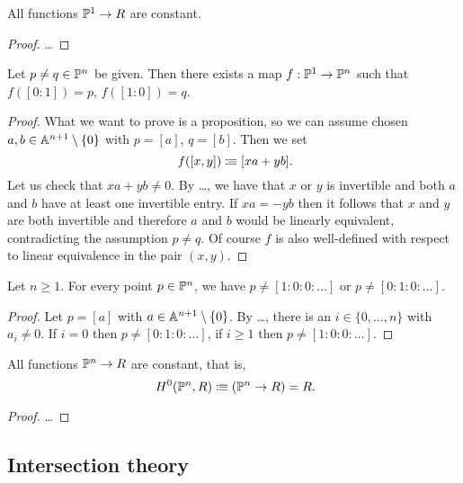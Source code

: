 \begin{lemma}
  All functions $\mathbb{P}^1 \to R$ are constant.
\end{lemma}

\begin{proof}
  \dots
\end{proof}

\begin{lemma}
  Let $p \neq q \in \mathbb{P}^n$ be given.
  Then there exists a map $f : \mathbb{P}^1 \to \mathbb{P}^n$
  such that $f([0 : 1]) = p$, $f([1 : 0]) = q$.
\end{lemma}

\begin{proof}
  What we want to prove is a proposition,
  so we can assume chosen $a, b \in \mathbb{A}^{n+1} \setminus \{0\}$
  with $p = [a]$, $q = [b]$.
  Then we set
  \[ f([x, y]) \colonequiv [xa + yb] \rlap{.}\]
  Let us check that $xa + yb \neq 0$.
  By \dots,
  we have that $x$ or $y$ is invertible
  and both $a$ and $b$ have at least one invertible entry.
  If $xa = - yb$
  then it follows that $x$ and $y$ are both invertible
  and therefore $a$ and $b$ would be linearly equivalent,
  contradicting the assumption $p \neq q$.
  Of course $f$ is also well-defined
  with respect to linear equivalence in the pair $(x, y)$.
\end{proof}

\begin{lemma}
  Let $n \geq 1$.
  For every point $p \in \mathbb{P}^n$,
  we have $p \neq [1 : 0 : 0 : \dots]$
  or $p \neq [0 : 1 : 0 : \dots]$.
\end{lemma}

\begin{proof}
  Let $p = [a]$ with $a \in \mathbb{A}^{n+1} \setminus \{0\}$.
  By \dots,
  there is an $i \in \{0, \dots, n\}$ with $a_i \neq 0$.
  If $i = 0$ then $p \neq [0 : 1 : 0 : \dots]$,
  if $i \geq 1$ then $p \neq [1 : 0 : 0 : \dots]$.
\end{proof}

\begin{theorem}
  All functions $\mathbb{P}^n \to R$ are constant,
  that is,
  \[ H^0(\bP^n, R) \colonequiv (\bP^n \to R) = R \rlap{.} \]
\end{theorem}

\begin{proof}
  \dots
\end{proof}


\subsection{Intersection theory}

